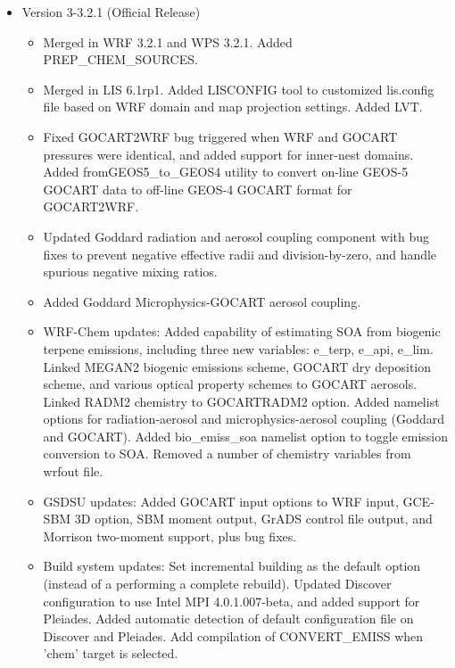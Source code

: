 \begin{itemize}
\item Version 3-3.2.1 (Official Release)
  \begin{itemize}
    \item Merged in WRF 3.2.1 and WPS 3.2.1.  Added PREP\_CHEM\_SOURCES.
    \item Merged in LIS 6.1rp1. Added LISCONFIG tool to customized lis.config
      file based on WRF domain and map projection settings. Added LVT.
    \item Fixed GOCART2WRF bug triggered when WRF and GOCART pressures were
      identical, and added support for inner-nest domains. Added
      fromGEOS5\_to\_GEOS4 utility to convert on-line GEOS-5 GOCART data to
      off-line GEOS-4 GOCART format for GOCART2WRF.
    \item Updated Goddard radiation and aerosol coupling component with bug
      fixes to prevent negative effective radii and division-by-zero, and
      handle spurious negative mixing ratios.
    \item Added Goddard Microphysics-GOCART aerosol coupling.
    \item WRF-Chem updates: Added capability of estimating SOA from biogenic
      terpene emissions, including three new variables: e\_terp, e\_api,
      e\_lim. Linked MEGAN2 biogenic emissions scheme, GOCART dry deposition
      scheme, and various optical property schemes to GOCART aerosols. Linked
      RADM2 chemistry to GOCARTRADM2 option. Added namelist options for
      radiation-aerosol and microphysics-aerosol coupling (Goddard and
      GOCART). Added bio\_emiss\_soa namelist option to toggle emission
      conversion to SOA. Removed a number of chemistry variables from wrfout
      file.
    \item GSDSU updates: Added GOCART input options to WRF input, GCE-SBM 3D
      option, SBM moment output, GrADS control file output, and Morrison
      two-moment support, plus bug fixes.
    \item Build system updates: Set incremental building as the default option
      (instead of a performing a complete rebuild). Updated Discover
      configuration to use Intel MPI 4.0.1.007-beta, and added support for
      Pleiades. Added automatic detection of default configuration file on
      Discover and Pleiades. Add compilation of CONVERT\_EMISS when 'chem'
      target is selected.
  \end{itemize}


\end{itemize}
